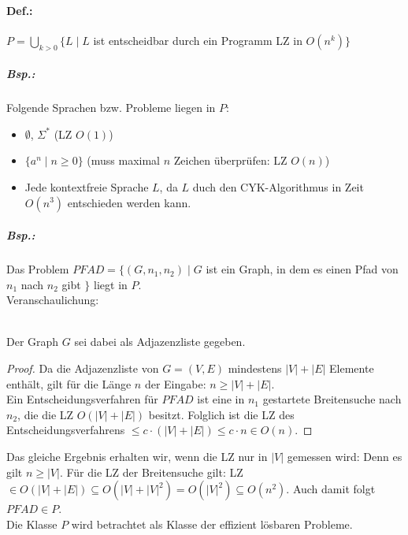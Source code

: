\paragraph{Def.:} $P=\bigcup_{k>0} \{ L\;|\; L$ ist entscheidbar durch ein Programm LZ in $O(n^k)\}$
\subparagraph{Bsp.:} Folgende Sprachen bzw. Probleme liegen in $P$:
\begin{itemize}
\item $\emptyset$, $\Sigma^*$ (LZ $O(1)$)
\item $\{a^n\;| \; n\geq 0\}$ (muss maximal $n$ Zeichen überprüfen: LZ $O(n)$)
\item Jede kontextfreie Sprache $L$, da $L$ duch den CYK-Algorithmus in Zeit $O(n^3)$ entschieden werden kann.
\end{itemize}
\subparagraph{Bsp.:} Das Problem $PFAD=\{(G,n_1,n_2)\;|\; G$ ist ein Graph, in dem es einen Pfad von $n_1$ nach $n_2$ gibt $\}$ liegt in $P$.\\
Veranschaulichung:\\
\\
Der Graph $G$ sei dabei als Adjazenzliste gegeben.
\begin{proof}
Da die Adjazenzliste von $G=(V,E)$ mindestens $|V|+|E|$ Elemente enthält, gilt für die Länge $n$ der Eingabe: $n\geq |V|+|E|$.\\
Ein Entscheidungsverfahren für $PFAD$ ist eine in $n_1$ gestartete Breitensuche nach $n_2$, die die LZ $O(|V|+|E|)$ besitzt. Folglich ist die LZ des Entscheidungsverfahrens $\leq c \cdot (|V|+|E|) \leq c \cdot n \in O(n)$. 
\end{proof}
Das gleiche Ergebnis erhalten wir, wenn die LZ nur in $|V|$ gemessen wird: Denn es gilt $n \geq |V|$. Für die LZ der Breitensuche gilt: LZ$\in O(|V|+|E|)\subseteq O (|V|+|V|^2)=O(|V|^2)\subseteq O(n^2)$.  Auch damit folgt $PFAD \in P$.\medskip\\
Die Klasse $P$ wird betrachtet als Klasse der effizient lösbaren Probleme.

